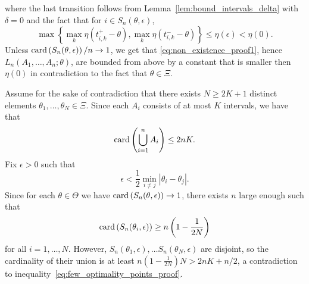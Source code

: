 where the last transition follows from Lemma~\ref{lem:bound_intervals_delta} with $\delta =0$ and the fact that for $i \in S_n(\theta, \epsilon)$, 
\begin{equation*}
\max\left\{ \max_k \eta(t^+_{i,k}-\theta) , \max_k \eta(t^-_{i,k}-\theta)  \right\} \leq \eta(\epsilon) < \eta(0). 
\end{equation*}
Unless  $\mathrm{card} \left(S_n(\theta, \epsilon) \right)/n \to 1$, we get that \eqref{eq:non_existence_proof1}, hence $L_n(A_1,\ldots,A_n ; \theta)$, are bounded from above by a constant that is smaller then $\eta(0)$ in contradiction to the fact that $\theta \in \Xi$.

Assume for the sake of contradiction that there exists $N \geq 2K + 1$
distinct elements $\theta_1,\ldots,\theta_N \in \Xi$. Since each $A_i$
consists of at most $K$ intervals, we have that
\begin{equation}
  \label{eq:few_optimality_points_proof}
  \mathrm{card} \left(\bigcup_{i=1}^n  A_i \right) \leq 2 n K. 
\end{equation}
Fix $\epsilon>0$ such that 
\begin{equation*}
  \epsilon < \frac{1}{2}\min_{i\neq j} |\theta_i - \theta_j|. 
\end{equation*}
Since for each $\theta \in \Theta$ we have $\mathrm{card} \left(S_n(\theta, \epsilon) \right) \to 1$, there exists $n$ large enough such that 
\begin{equation*}
  \mathrm{card} \left(S_n(\theta_i, \epsilon) \right)
  \geq n \left(1-\frac{1}{2N} \right)
\end{equation*}
for all $i=1,\ldots,N$. However, $S_n(\theta_1,\epsilon), \ldots
S_n(\theta_N,\epsilon)$ are disjoint, so the cardinality of their union is
at least $n\left(1-\frac{1}{2N} \right)N > 2nK + n/2$, a contradiction to
inequality~\eqref{eq:few_optimality_points_proof}.

